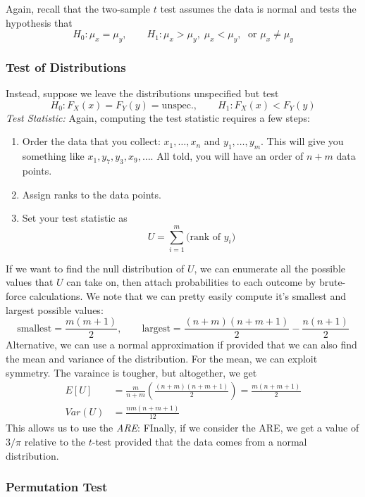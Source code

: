 \documentclass[a4paper,12pt]{scrartcl}
\begin{document}
Again, recall that the two-sample $t$ test assumes the data is normal
and tests the hypothesis that
   \[ H_0: \mu_x = \mu_y, \qquad H_1: \mu_x > \mu_y,\; \mu_x < \mu_y,\;
      \text{ or }\mu_x \neq \mu_y \]

\subsubsection{Test of Distributions}

Instead, suppose we leave the distributions unspecified but test
   \[ H_0: F_X(x) = F_Y(y) = \text{unspec.}, \qquad
      H_1: F_X(x) < F_Y(y) \]
{\sl Test Statistic:} Again, computing the test statistic requires
a few steps:
\begin{enumerate}
   \item Order the data that you collect: $x_1, \ldots, x_n$ and
      $y_1, \ldots, y_m$. This will give you something like
      $x_1, y_7, y_3, x_9, \ldots$.  All told, you will have an order
      of $n+m$ data points.
   \item Assign ranks to the data points. 
   \item Set your test statistic as
      \[ U = \sum^m_{i=1} \text{(rank of $y_i$)} \]
\end{enumerate}
If we want to find the null distribution of $U$, we can 
enumerate all the possible values that $U$ can take on, then attach
probabilities to each outcome by brute-force calculations.
We note that
we can pretty easily compute it's smallest and largest possible values:
   \[ \text{smallest} = \frac{m(m+1)}{2}, \qquad \text{largest} =
      \frac{(n+m)(n+m+1)}{2} - \frac{n(n+1)}{2} \]
Alternative, we can use a normal approximation if provided that 
we can also find the mean and variance of the distribution. 
For the mean, we can exploit symmetry. The varaince is tougher, but
altogether, we get
\begin{align*}
    E[U] &= \frac{m}{n+m} \left( \frac{(n+m)(n+m+1)}{2}\right) = 
      \frac{m(n+m+1)}{2} \\
   Var(U) &= \frac{nm(n+m+1)}{12}  
\end{align*}
This allows us to use the 
{\sl ARE}: FInally, if we consider the ARE, we get a value of $3/\pi$
relative to the $t$-test provided that the data comes from a normal 
distribution.

\newpage

\subsubsection{Permutation Test}
\end{document}
